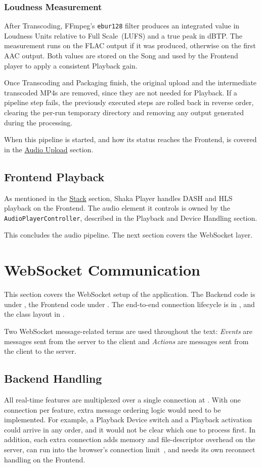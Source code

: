\subsubsection*{Loudness Measurement}
After Transcoding, FFmpeg's \texttt{ebur128} filter produces an
integrated value in Loudness Units relative to Full Scale~(LUFS) and
a true peak in dBTP\@. The measurement runs on the FLAC output if it
was produced, otherwise on the first AAC output. Both values are
stored on the Song and used by the Frontend player to apply a
consistent Playback gain.

Once Transcoding and Packaging finish, the original upload and the
intermediate transcoded MP4s are removed, since they are not needed for Playback.
If a pipeline step fails, the previously executed steps are rolled back in
reverse order, clearing the per-run temporary directory and removing
any output generated during the processing.

When this pipeline is started, and how its status reaches the
Frontend, is covered in the \hyperref[sec:audio_upload]{Audio Upload}
section.

\subsection{Frontend Playback}
As mentioned in the \hyperref[sec:stack]{Stack} section, Shaka Player
handles DASH and HLS playback on the Frontend. The audio element it
controls is owned by the \texttt{AudioPlayerController}, described in
the Playback and Device Handling section.

This concludes the audio pipeline. The next section covers the
WebSocket layer.


\section{WebSocket Communication}\label{sec:ws}
This section covers the WebSocket setup of the application. The
Backend code is under , the
Frontend code under . The end-to-end
connection lifecycle is in
, and the class layout in
.

Two WebSocket message-related terms are used throughout the text: \textit{Events} are messages sent
from the server to the client and \textit{Actions} are messages sent from the client to the server.

\subsection{Backend Handling}
All real-time features are multiplexed over a single connection at
. With one connection per feature, extra message
ordering logic would need to be implemented. For example, a Playback
Device switch and a Playback activation could arrive in any order, and
it would not be clear which one to process first.
In addition, each extra connection adds memory and file-descriptor
overhead on the server, can run into the browser's connection limit~\parencite{browser_connection_limit},
and needs its own reconnect handling on the Frontend.

